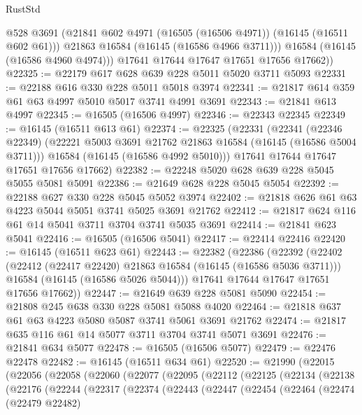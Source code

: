 \begin{lexlean}{RustStd}
\begin{coremodule}
            @528
            @3691
            (@21841 @602 @4971 (@16505 (@16506 @4971)) (@16145 (@16511 @602 @61)))
            @21863
            @16584
            (@16145 (@16586 @4966 @3711)))
          @16584
          (@16145 (@16586 @4960 @4974)))
        @17641
        @17644
        @17647
        @17651
        @17656
        @17662))
@22325 := @22179 @617 @628 @639 @228 @5011 @5020 @3711 @5093
@22331 := @22188 @616 @330 @228 @5011 @5018 @3974
@22341 := @21817 @614 @359 @61 @63 @4997 @5010 @5017 @3741 @4991 @3691
@22343 := @21841 @613 @4997
@22345 := @16505 (@16506 @4997)
@22346 := @22343 @22345
@22349 := @16145 (@16511 @613 @61)
@22374 := @22325
    (@22331
      (@22341
        (@22346 @22349)
        (@22221 @5003 @3691 @21762 @21863 @16584 (@16145 (@16586 @5004 @3711)))
        @16584
        (@16145 (@16586 @4992 @5010)))
      @17641
      @17644
      @17647
      @17651
      @17656
      @17662)
@22382 := @22248 @5020 @628 @639 @228 @5045 @5055 @5081 @5091
@22386 := @21649 @628 @228 @5045 @5054
@22392 := @22188 @627 @330 @228 @5045 @5052 @3974
@22402 := @21818 @626 @61 @63 @4223 @5044 @5051 @3741 @5025 @3691 @21762
@22412 := @21817 @624 @116 @61 @14 @5041 @3711 @3704 @3741 @5035 @3691
@22414 := @21841 @623 @5041
@22416 := @16505 (@16506 @5041)
@22417 := @22414 @22416
@22420 := @16145 (@16511 @623 @61)
@22443 := @22382
    (@22386
      (@22392
        (@22402
          (@22412 (@22417 @22420) @21863 @16584 (@16145 (@16586 @5036 @3711)))
          @16584
          (@16145 (@16586 @5026 @5044)))
        @17641
        @17644
        @17647
        @17651
        @17656
        @17662))
@22447 := @21649 @639 @228 @5081 @5090
@22454 := @21808 @245 @638 @330 @228 @5081 @5088 @4020
@22464 := @21818 @637 @61 @63 @4223 @5080 @5087 @3741 @5061 @3691 @21762
@22474 := @21817 @635 @116 @61 @14 @5077 @3711 @3704 @3741 @5071 @3691
@22476 := @21841 @634 @5077
@22478 := @16505 (@16506 @5077)
@22479 := @22476 @22478
@22482 := @16145 (@16511 @634 @61)
@22520 := @21990
    (@22015
      (@22056
        (@22058
          (@22060
            (@22077
              (@22095
                (@22112
                  (@22125
                    (@22134
                      (@22138
                        (@22176
                          (@22244
                            (@22317
                              (@22374
                                (@22443
                                  (@22447
                                    (@22454
                                      (@22464
                                        (@22474
                                          (@22479 @22482)

\end{coremodule}
\end{lexlean}
